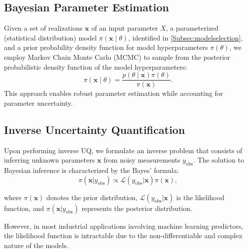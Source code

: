 \documentclass{article}
\begin{document}
	\subsection{Bayesian Parameter Estimation}\label{Subsec:parameterestimation}
	Given a set of realizations $\bm{x}$ of an input parameter $X$, a parameterized (statistical distribution) model $\pi(\bm{x} \mid \theta)$, identified in \cref{Subsec:modelselection}, and a prior probability density function for model hyperparameters $\pi(\theta)$, we employ Markov Chain Monte Carlo (MCMC) to sample from the posterior probabilistic density function of the model hyperparameters:
	\begin{equation}
		\pi(\bm{x} \mid \theta) = \frac{p(\theta\mid \bm{x}) \pi(\theta)}{\pi(\bm{x})}.
	\end{equation}
	This approach enables robust parameter estimation while accounting for parameter uncertainty.
		
	\subsection{Inverse Uncertainty Quantification}\label{Subsec:InvUQ}
		
	Upon performing inverse UQ, we formulate an inverse problem that consists of inferring unknown parameters $\bm{x}$ from noisy measurements $y_\text{obs}$. %
	The solution to Bayesian inference is characterized by the Bayes' formula: $$\pi(\bm{x}|y_\text{obs}) \propto \mathcal{L}(y_\text{obs}|\bm{x}) \pi(\bm{x}),$$
		
	where $\pi(\bm{x})$ denotes the prior distribution, $\mathcal{L}(y_\text{obs}|\bm{x})$ is the likelihood function, and $\pi(\bm{x}|y_\text{obs})$ represents the posterior distribution.
		
	However, in most industrial applications involving machine learning predictors, the likelihood function is intractable due to the non-differentiable and complex nature of the models. %
		
\end{document}
